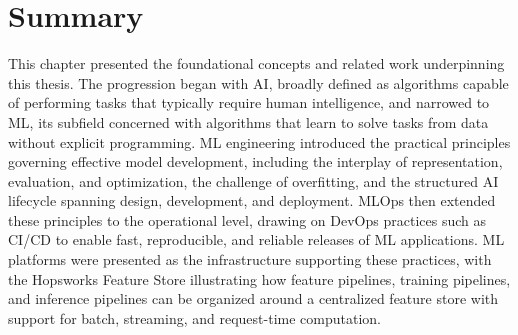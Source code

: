 \documentclass[
english,                 %
bibtex,                  %
]{kththesis}
\numberwithin{listing}{chapter}
\begin{document}
\section{Summary}
\label{sec:bg_summary}
\glsresetall

This chapter presented the foundational concepts and related work underpinning this thesis. The progression began with \gls{AI}, broadly defined as algorithms capable of performing tasks that typically require human intelligence, and narrowed to \gls{ML}, its subfield concerned with algorithms that learn to solve tasks from data without explicit programming. \Gls{ML} engineering introduced the practical principles governing effective model development, including the interplay of representation, evaluation, and optimization, the challenge of overfitting, and the structured \gls{AI} lifecycle spanning design, development, and deployment. \Gls{MLOps} then extended these principles to the operational level, drawing on \gls{DevOps} practices such as \gls{CI/CD} to enable fast, reproducible, and reliable releases of \gls{ML} applications. \Gls{ML} platforms were presented as the infrastructure supporting these practices, with the Hopsworks Feature Store illustrating how feature pipelines, training pipelines, and inference pipelines can be organized around a centralized feature store with support for batch, streaming, and request-time computation.
\end{document}
